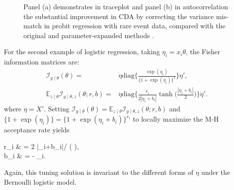 \documentclass[12pt]{article}
\newcommand{\be}{\begin{equs}}
\newcommand{\ee}{\end{equs}}
\newcommand{\bb}[1]{\mathbb{#1}}
\newcommand{\mc}[1]{\mathcal{#1}}
\newcommand{\diag}{\text{diag}}
\begin{document}
\begin{figure}[H]
  {%
    \qquad
  }
 {\caption{Panel (a) demonstrates in traceplot and panel (b) in autocorrelation the substantial improvement in CDA by correcting the variance mis-match in probit regression with rare event data, compared with the original \citep{albert1993bayesian} and parameter-expanded methods \citep{liu1999parameter}.}}
\end{figure}

 
For the second example of logistic regression, taking $\eta_i=x_i\theta$, the Fisher information matrices
are:
 \begin{eqnarray}
\mc I_{y\mid \theta}({\theta}) =&  \dot\eta \diag\bigg\{\frac{\exp(\eta_i)}{ \{1+\exp(\eta_i)\} ^2}\bigg\} \dot\eta', \nonumber \\
\bb E_{z\mid \theta}\mc I_{y\mid \theta,z}({\theta};r,b)= & \dot\eta  \diag\bigg\{ \frac{r_i}{2 |\eta_i+b_i|}\tanh\Big(\frac{|\eta_i+b_i|}{2} \Big)\bigg\} \dot\eta' .  \nonumber
\end{eqnarray}
where $\dot\eta=X'$. 
Setting $\mc I_{y\mid \theta}({\theta})=\bb E_{z\mid \theta}\mc I_{y\mid \theta,z}({\theta};r,b)$ and $ \{1+\exp(\eta_i)\}  = \{1+\exp(\eta_i+b_i)\}^{r_i}$
to locally maximize the M-H acceptance rate yields
\be
r_i & = {2 |\eta_i+b_i|}/ \tanh\Big( \Big),
\\ b_i & =  - \eta_i.
\ee
{Again, this tuning solution is invariant to the different forms of $\eta$ under
the Bernoulli logistic model.}
\end{document}
